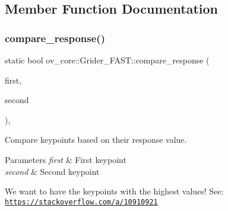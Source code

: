 \subsection{Member Function Documentation}
\mbox{\label{classov__core_1_1Grider__FAST_a62a844fcba586eb31998ecf467634d6e}} 
\subsubsection{\texorpdfstring{compare\+\_\+response()}{compare\_response()}}
{\footnotesize\ttfamily static bool ov\+\_\+core\+::\+Grider\+\_\+\+F\+A\+S\+T\+::compare\+\_\+response (\begin{DoxyParamCaption}\item[{cv\+::\+Key\+Point}]{first,  }\item[{cv\+::\+Key\+Point}]{second }\end{DoxyParamCaption})\hspace{0.3cm}{\ttfamily [inline]}, {\ttfamily [static]}}



Compare keypoints based on their response value. 


\begin{DoxyParams}{Parameters}
{\em first} & First keypoint \\
\hline
{\em second} & Second keypoint\\
\hline
\end{DoxyParams}
We want to have the keypoints with the highest values! See\+: \href{https://stackoverflow.com/a/10910921}{\tt https\+://stackoverflow.\+com/a/10910921} \mbox{\label{classov__core_1_1Grider__FAST_a36acfad18dc36878776dd4fa21165eac}} 
